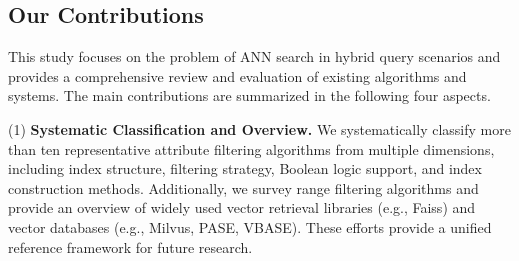 \documentclass[sigconf, nonacm]{acmart}
\begin{document}
\begin{sloppypar}

\subsection{Our Contributions}
This study focuses on the problem of ANN search in hybrid query scenarios and provides a comprehensive review and evaluation of existing algorithms and systems. The main contributions are summarized in the following four aspects.

(1)\textbf{ Systematic Classification and Overview.}
We systematically classify more than ten representative attribute filtering algorithms from multiple dimensions, including index structure, filtering strategy, Boolean logic support, and index construction methods. Additionally, we survey range filtering algorithms and provide an overview of widely used vector retrieval libraries (e.g., Faiss) and vector databases (e.g., Milvus, PASE, VBASE). These efforts provide a unified reference framework for future research.


\end{sloppypar}
\end{document}
